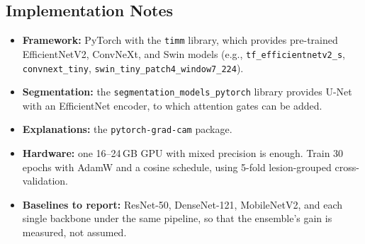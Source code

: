 \documentclass[10pt,a4paper]{article}
\begin{document}
\subsection{Implementation Notes}
\begin{itemize}
  \item \textbf{Framework:} PyTorch with the \texttt{timm} library, which
        provides pre-trained EfficientNetV2, ConvNeXt, and Swin models
        (e.g., \texttt{tf\_efficientnetv2\_s}, \texttt{convnext\_tiny},
        \texttt{swin\_tiny\_patch4\_window7\_224}).
  \item \textbf{Segmentation:} the \texttt{segmentation\_models\_pytorch}
        library provides U-Net with an EfficientNet encoder, to which
        attention gates can be added.
  \item \textbf{Explanations:} the \texttt{pytorch-grad-cam} package.
  \item \textbf{Hardware:} one 16--24\,GB GPU with mixed precision is
        enough. Train 30 epochs with AdamW and a cosine schedule, using
        5-fold lesion-grouped cross-validation.
  \item \textbf{Baselines to report:} ResNet-50, DenseNet-121,
        MobileNetV2, and each single backbone under the same pipeline,
        so that the ensemble's gain is measured, not assumed.
\end{itemize}




\end{document}
